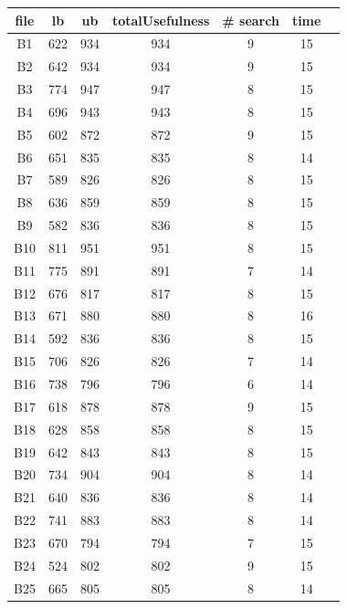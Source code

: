 \documentclass[a4paper ,12pt,french]{article}
\begin{document}
\begin{figure}[!h]
\begin{tabular}{|c|c|c|c|c|c|c|}
\hline
file&lb&ub&totalUsefulness&\# search&time\\
\hline
\hline
B1&622&934&934&9&15\\ \hline
B2&642&934&934&9&15\\ \hline
B3&774&947&947&8&15\\ \hline
B4&696&943&943&8&15\\ \hline
B5&602&872&872&9&15\\ \hline
B6&651&835&835&8&14\\ \hline
B7&589&826&826&8&15\\ \hline
B8&636&859&859&8&15\\ \hline
B9&582&836&836&8&15\\ \hline
B10&811&951&951&8&15\\ \hline
B11&775&891&891&7&14\\ \hline
B12&676&817&817&8&15\\ \hline
B13&671&880&880&8&16\\ \hline
B14&592&836&836&8&15\\ \hline
B15&706&826&826&7&14\\ \hline
B16&738&796&796&6&14\\ \hline
B17&618&878&878&9&15\\ \hline
B18&628&858&858&8&15\\ \hline
B19&642&843&843&8&15\\ \hline
B20&734&904&904&8&14\\ \hline
B21&640&836&836&8&14\\ \hline
B22&741&883&883&8&14\\ \hline
B23&670&794&794&7&15\\ \hline
B24&524&802&802&9&15\\ \hline
B25&665&805&805&8&14\\ \hline
\end{tabular}
\end{figure}
\end{document}
